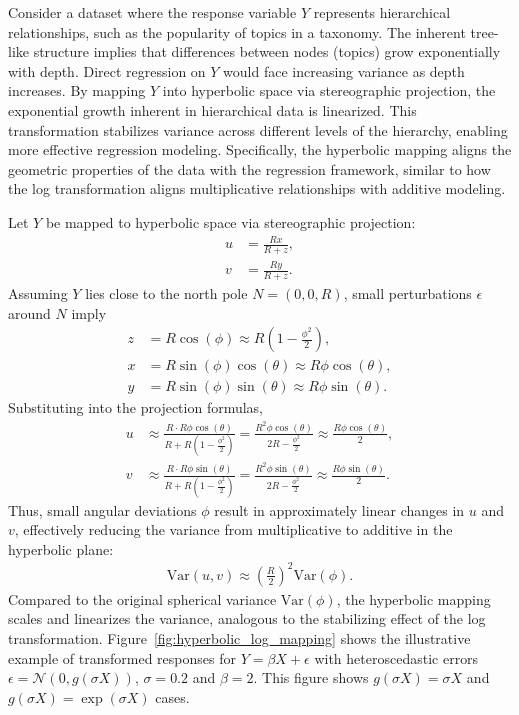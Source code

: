 \begin{example}
    Consider a dataset where the response variable $Y$ represents hierarchical relationships, such as the popularity of topics in a taxonomy.
    The inherent tree-like structure implies that differences between nodes (topics) grow exponentially with depth.
    Direct regression on $Y$ would face increasing variance as depth increases.
    By mapping $Y$ into hyperbolic space via stereographic projection, the exponential growth inherent in hierarchical data is linearized.
    This transformation stabilizes variance across different levels of the hierarchy, enabling more effective regression modeling.
    Specifically, the hyperbolic mapping aligns the geometric properties of the data with the regression framework, similar to how the log transformation aligns multiplicative relationships with additive modeling.

    Let $Y$ be mapped to hyperbolic space via stereographic projection:
    \begin{align*}
        u &= \frac{Rx}{R + z}, \\
        v &= \frac{Ry}{R + z}.
    \end{align*}
    Assuming $Y$ lies close to the north pole $N = (0, 0, R)$, small perturbations $\epsilon$ around $N$ imply
    \begin{align*}
        z &= R\cos(\phi) \approx R\left(1 - \frac{\phi^2}{2}\right), \\
        x &= R\sin(\phi)\cos(\theta) \approx R\phi\cos(\theta), \\
        y &= R\sin(\phi)\sin(\theta) \approx R\phi\sin(\theta).
    \end{align*}
    Substituting into the projection formulas,
    \begin{align*}
        u &\approx \frac{R\cdot R\phi\cos(\theta)}{R + R\left(1 - \frac{\phi^2}{2}\right)} = \frac{R^2 \phi \cos(\theta)}{2R - \frac{\phi^2}{2}} \approx \frac{R\phi\cos(\theta)}{2}, \\
        v &\approx \frac{R \cdot R\phi\sin(\theta)}{R + R\left(1 - \frac{\phi^2}{2}\right)} = \frac{R^2 \phi \sin(\theta)}{2R - \frac{\phi^2}{2}} \approx \frac{R\phi\sin(\theta)}{2}.
    \end{align*}
    Thus, small angular deviations $\phi$ result in approximately linear changes in $u$ and $v$, effectively reducing the variance from multiplicative to additive in the hyperbolic plane:
    \begin{align*}
        \mathrm{Var}(u, v) \approx \left(\frac{R}{2}\right)^2\mathrm{Var}(\phi).
    \end{align*}
    Compared to the original spherical variance $\mathrm{Var}(\phi)$, the hyperbolic mapping scales and linearizes the variance, analogous to the stabilizing effect of the log transformation.
    Figure~\ref{fig:hyperbolic_log_mapping} shows the illustrative example of transformed responses for $Y = \beta X + \epsilon$ with heteroscedastic errors $\epsilon = \mathcal{N}(0, g(\sigma X))$, $\sigma = 0.2$ and $\beta = 2$.
    This figure shows $g(\sigma X) = \sigma X$ and $g(\sigma X) = \exp(\sigma X)$ cases.
\end{example}

